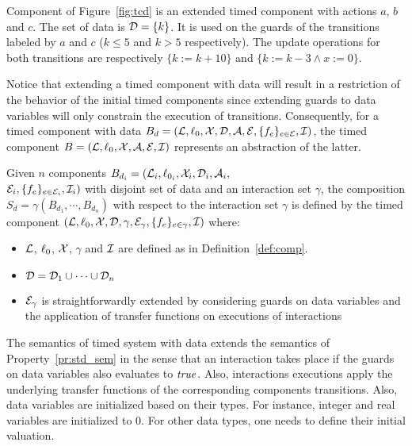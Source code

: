 
\begin{example}
  Component of Figure~\ref{fig:tcd} is an extended timed component with actions $a$, $b$ and $c$.
  The set of data is $\mathcal{D}=\{k\}$. It is used on the guards of the transitions labeled by
  $a$ and $c$ ($k\le 5$ and $k>5$ respectively). The update operations for both transitions
  are respectively $\{k:=k+10\}$ and $\{k:=k-3\wedge x:=0\}$.
\end{example}
\begin{remark}
  Notice that extending a timed component with data will result in a restriction
  of the behavior of the initial timed components since extending guards to data
  variables will only constrain the execution of transitions. Consequently,
  for a timed component with data $B_d=(\mathcal{L},\ell_0,\mathcal{X},\mathcal{D},\mathcal{A},\mathcal{E},\{f_e\}_{e\in\mathcal{E}},\mathcal{I})$, 
  the timed component $B=(\mathcal{L},\ell_0,\mathcal{X},\mathcal{A},\mathcal{E},\mathcal{I})$ represents an abstraction of the latter. 
\end{remark}

\begin{definition}\label{def:tce_sem}
  Given $n$ components $B_{d_i}=(\mathcal{L}_i,\ell_{0_i},\mathcal{X}_i,\mathcal{D}_i,\mathcal{A}_i,$\\$
  \mathcal{E}_i,\{f_e\}_{e\in\mathcal{E}_i},\mathcal{I}_i)$ with disjoint set of data and an interaction set $\gamma$,
  the composition $S_d=\gamma(B_{d_1},\cdots,B_{d_n})$ with respect to 
  the interaction set $\gamma$ is defined by the timed component 
  $(\mathcal{L},\ell_0,\mathcal{X},\mathcal{D},\gamma,\mathcal{E}_{\gamma},\{f_e\}_{e\in\gamma},\mathcal{I})$ where:
  \begin{itemize}
    \item $\mathcal{L}$, $\ell_0$, $\mathcal{X}$, $\gamma$ and $\mathcal{I}$ are defined as
      in Definition~\ref{def:comp}.
    \item $\mathcal{D}=\mathcal{D}_1\cup\cdots\cup\mathcal{D}_n$
    \item $\mathcal{E}_{\gamma}$ is straightforwardly extended by considering guards
      on data variables and the application of transfer functions on executions of interactions
  \end{itemize}
\end{definition}
The semantics of timed system with data extends the semantics of Property~\ref{pr:std_sem}
in the sense that an interaction takes place if the guards on data variables also evaluates
to $\textnormal{\textit{true}}$. Also, interactions executions apply the underlying transfer functions of the
corresponding components transitions.
Also, data variables are initialized based on their types. For instance, integer and real 
variables are initialized to 0. For other data types, one needs to define their initial 
valuation.

